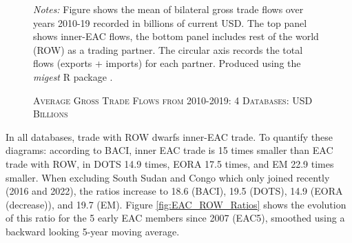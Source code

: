 \documentclass[a4paper]{article}
\begin{document}

\begin{figure}[h!] \vspace{-1mm}
\centering
\caption{\label{fig:MIG}\textsc{Average Gross Trade Flows from 2010-2019: 4 Databases: USD Billions}}
\vspace{2mm}
\raggedright
\scriptsize 
\emph{Notes:} Figure shows the mean of bilateral gross trade flows over years 2010-19 recorded in billions of current USD. The top panel shows inner-EAC flows, the bottom panel includes rest of the world (ROW) as a trading partner. The circular axis records the total flows (exports + imports) for each partner. Produced using the \emph{migest} R package \citep{rmigest}.
\end{figure}
\FloatBarrier

In all databases, trade with ROW dwarfs inner-EAC trade. To quantify these diagrams: according to BACI, inner EAC trade is 15 times smaller than EAC trade with ROW, in DOTS 14.9 times, EORA 17.5 times, and EM 22.9 times smaller. When excluding South Sudan and Congo which only joined recently (2016 and 2022), the ratios increase to 18.6 (BACI), 19.5 (DOTS), 14.9 (EORA (decrease)), and 19.7 (EM). Figure \ref{fig:EAC_ROW_Ratios} shows the evolution of this ratio for the 5 early EAC members since 2007 (EAC5), smoothed using a backward looking 5-year moving average. 
\end{document}
